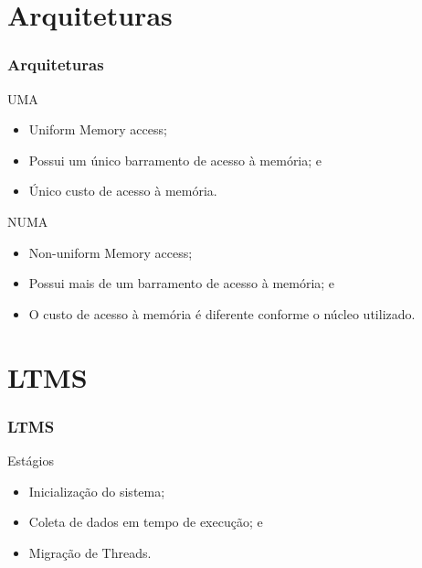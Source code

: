 \documentclass[10pt, pdf,xcolor=pdftex,dvipsnames,table]{beamer}
\begin{document}
\section{Arquiteturas}
\begin{frame} \frametitle{Arquiteturas}
\begin{block}{UMA}
\begin{itemize}
	\item Uniform Memory access;
	\item Possui um único barramento de acesso à memória; e
	\item Único custo de acesso à memória.
\end{itemize}
\end{block}
\begin{block}{NUMA}
\begin{itemize}
	\item Non-uniform Memory access;
	\item Possui mais de um barramento de acesso à memória; e
	\item O custo de acesso à memória é diferente conforme o núcleo utilizado.
\end{itemize}
\end{block}
\end{frame}

\section{LTMS}
\begin{frame} \frametitle{LTMS}
    \begin{block}{Estágios}
        \begin{itemize}
        	\item Inicialização do sistema;
        	\item Coleta de dados em tempo de execução; e
        	\item Migração de Threads.
        \end{itemize}
    \end{block}
\end{frame}
\end{document}
